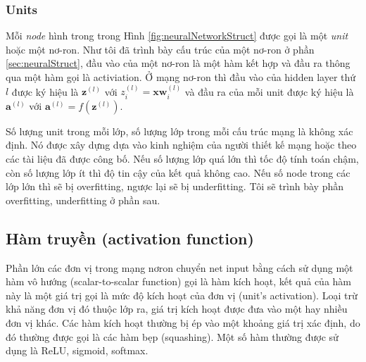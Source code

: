 \subsubsection{Units}
Mỗi \textit{node} hình trong trong Hình \ref{fig:neuralNetworkStruct} được gọi là một \textit{unit} hoặc một nơ-ron. Như tôi đã trình bày cấu trúc của một nơ-ron ở phần \ref{sec:neuralStruct}, đầu vào của một nơ-ron là một hàm kết hợp và đầu ra thông qua một hàm gọi là activiation. Ở mạng nơ-ron thì đầu vào của hidden layer thứ $l$ được ký hiệu là $\textbf{z}^{(l)}$ với $z^{(l)}_i = \textbf{x}\textbf{w}^{(l)}_i$ và đầu ra của mỗi unit được ký hiệu là $\textbf{a}^{(l)}$ với $\textbf{a}^{(l)}= f(\textbf{z}^{(l)})$.\par

	Số lượng unit trong mỗi lớp, số lượng lớp trong mỗi cấu trúc mạng là không xác định. Nó được xây dựng dựa vào kinh nghiệm của người thiết kế mạng hoặc theo các tài liệu đã được công bố. Nếu số lượng lớp quá lớn thì tốc độ tính toán chậm, còn số lượng lớp ít thì độ tin cậy của kết quả không cao. Nếu số node trong các lớp lớn thì sẽ bị overfitting, ngược lại sẽ bị underfitting. Tôi sẽ trình bày phần overfitting, underfitting ở phần sau.
\subsection{Hàm truyền (activation function)}
\label{sec:activationFunc}
\hspace{5mm} Phần lớn các đơn vị trong mạng nơron chuyển net input  bằng cách sử dụng một hàm vô hướng (scalar-to-scalar function) gọi là hàm kích hoạt, kết quả của hàm này là một giá trị gọi là mức độ kích hoạt của đơn vị (unit's activation). Loại trừ khả năng đơn vị đó thuộc lớp ra, giá trị kích hoạt được đưa vào một hay nhiều đơn vị khác. Các hàm kích hoạt thường bị ép vào một khoảng giá trị xác định, do đó thường được gọi là các hàm bẹp (squashing). Một số hàm thường được sử dụng là ReLU, sigmoid, softmax.
